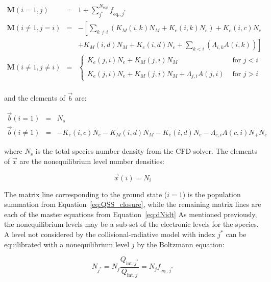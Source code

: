 {\begin{eqnarray}
 \boldsymbol{M}(i=1,j) &=& 1 + \sum_{j^\ast}^{N_{\text{eqs}}} f_{\text{eq.},j^\ast} \nonumber \\
 \boldsymbol{M}(i\neq1,j = i) &=& - \left [ \sum_{k \neq i} \left ( K_{M}(i,k)N_{M} + K_{e}(i,k)N_{e} \right ) + K_{e}(i,c)N_{e} \right . \nonumber \\
                               & & \left . + K_{M}(i,d)N_{M} + K_{e}(i,d)N_{e} + \sum_{k < i } \left ( \Lambda_{i,k}A(i,k) \right ) \right ] \nonumber \\
\boldsymbol{M}(i\neq1,j \neq i) &=& \left \lbrace \begin{array}{cc} K_{e}(j,i)N_{e} + K_{M}(j,i)N_{M} & \text{   for   } j < i \\ \\ K_{e}(j,i)N_{e} + K_{M}(j,i)N_{M} + \Lambda_{j,i}A(j,i) & \text{   for   } j > i \end{array} \right . \nonumber \\ \label{eq:M_elements} 
\end{eqnarray}

\noindent and the elements of $\vec{b}$ are:

\begin{eqnarray}
 \vec{b}(i=1) &=& N_{s} \nonumber \\
 \vec{b}(i\neq1) &=& - K_{e}(i,c)N_{e} - K_{M}(i,d)N_{M} - K_{e}(i,d)N_{e} - \Lambda_{c,i} A(c,i) N_{+} N_{e} \label{eq:b_elements}
\end{eqnarray}

\noindent where $N_s$ is the total species number density from the CFD solver.
The elements of $\vec{x}$ are the nonequilibrium level number densities:

\begin{equation}
 \vec{x}(i) = N_i
\end{equation}

The matrix line corresponding to the ground state ($i=1$) is the population summation from Equation~\ref{eq:QSS_closure}, while the remaining matrix lines are each of the master equations from Equation~\ref{eq:dNidt}
As mentioned previously, the nonequilibrium levels may be a sub-set of the electronic levels for the species.
A level not considered by the collisional-radiative model with index $j^\ast$ can be equilibrated with a nonequilibrium level $j$ by the Boltzmann equation:

\begin{equation}
 N_{j^\ast} = N_j \frac{Q_{\text{int},{j^\ast}}}{Q_{\text{int},{j}}} = N_j  f_{\text{eq.},j^\ast} \label{eq:F_eq}
\end{equation}

}
